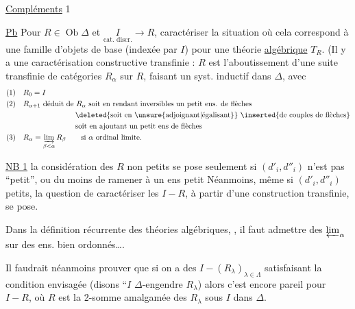 \uline{Compléments}
\textcircled{1}

\uline{Pb} Pour $R\in\operatorname{Ob}\Delta$ et $\underset{\text{cat. discr.}}I\longrightarrow R$, caractériser la situation où cela correspond à une famille d'objets de base (indexée par $I$) pour une théorie \uline{algébrique} $T_R$. (Il y a une caractérisation constructive transfinie : $R$ est l'aboutissement d'une suite transfinie de catégories $R_\alpha$ sur $R$, faisant un  syst. inductif  dans $\Delta$, avec
\[
 \begin{aligned}
 (1)\quad &R_0=I\\
 (2)\quad &R_{\alpha+1}\ \text{déduit de $R_\alpha$ soit en rendant inversibles un petit ens. de flèches}\\
 &\hspace{7em}\text{\deleted{soit en \unsure{adjoignant|égalisant}} \inserted{de couples de flèches}}\\
 &\hspace{7em}\text{soit en ajoutant un petit ens de flèches}\\
 (3)\quad &R_\alpha=\varinjlim_{\beta<\alpha} R_\beta\qquad\text{si $\alpha$ ordinal limite.}
 \end{aligned}
\]

\uline{NB 1}  la considération des $R$ non petits se pose seulement si $(d'_i,d''_i)$ n'est pas ``petit'', ou du moins de ramener à un ens petit  Néanmoins, même si $(d'_i,d''_i)$ petits, la question de caractériser les $I\mathbin{-}R$, à partir d'une construction transfinie, se pose.

Dans la définition récurrente des théories algébriques,  ,  il faut admettre des $\varprojlim_{\alpha}$ sur des ens. bien ordonnés\ldots.

Il faudrait néanmoins prouver que si on a des $I\mathbin{-}(R_\lambda)_{\lambda\in\Lambda}$ satisfaisant la condition envisagée (disons ``$I$ $\Delta$-engendre $R_\lambda$) alors c'est encore pareil pour $I\mathbin{-}R$, où $R$ est la 2-somme amalgamée des $R_\lambda$ sous $I$ dans $\Delta$.

